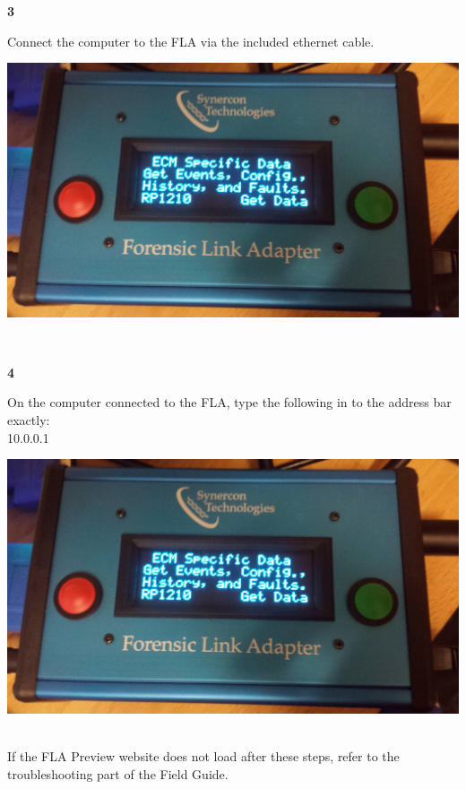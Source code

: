 \documentclass[11pt]{article}
\begin{document}
\noindent\begin{minipage}{0.3\textwidth}%
\begin{center}
\textbf{3}\\[\baselineskip]
\end{center}
Connect the computer to the FLA via the included ethernet cable.
\end{minipage}%
\hfill%
\begin{minipage}{0.6\textwidth}
\includegraphics[width=\linewidth]{../../media/fla_screens/ecm_confirm}
\end{minipage}\\[\baselineskip]
\noindent\begin{minipage}{0.3\textwidth}%
\begin{center}
\textbf{4}\\[\baselineskip]
\end{center}
On the computer connected to the FLA, type the following in to the address bar exactly:\\
10.0.0.1
\end{minipage}%
\hfill%
\begin{minipage}{0.6\textwidth}
\includegraphics[width=\linewidth]{../../media/fla_screens/ecm_confirm}
\end{minipage}\\[\baselineskip]
If the FLA Preview website does not load after these steps, refer to the troubleshooting part of the Field Guide.
\end{document}
